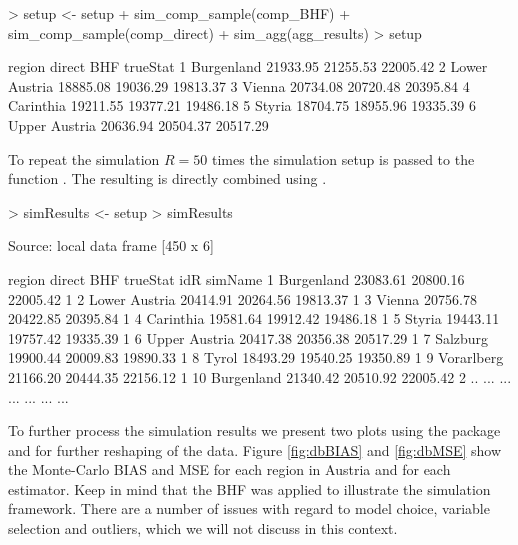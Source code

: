 \documentclass[article]{ajs}
\begin{document}
\begin{Schunk}
\begin{Sinput}
> setup <- setup %
+   sim_comp_sample(comp_BHF) %
+   sim_comp_sample(comp_direct) %
+   sim_agg(agg_results)
> setup
\end{Sinput}
\begin{Soutput}
         region   direct      BHF trueStat
1    Burgenland 21933.95 21255.53 22005.42
2 Lower Austria 18885.08 19036.29 19813.37
3        Vienna 20734.08 20720.48 20395.84
4     Carinthia 19211.55 19377.21 19486.18
5        Styria 18704.75 18955.96 19335.39
6 Upper Austria 20636.94 20504.37 20517.29
\end{Soutput}
\end{Schunk}

To repeat the simulation $R = 50$ times the simulation setup is passed to the function . The resulting  is directly combined using .

\begin{Schunk}
\begin{Sinput}
> simResults <- setup %
> simResults
\end{Sinput}
\begin{Soutput}
Source: local data frame [450 x 6]

          region   direct      BHF trueStat idR simName
1     Burgenland 23083.61 20800.16 22005.42   1        
2  Lower Austria 20414.91 20264.56 19813.37   1        
3         Vienna 20756.78 20422.85 20395.84   1        
4      Carinthia 19581.64 19912.42 19486.18   1        
5         Styria 19443.11 19757.42 19335.39   1        
6  Upper Austria 20417.38 20356.38 20517.29   1        
7       Salzburg 19900.44 20009.83 19890.33   1        
8          Tyrol 18493.29 19540.25 19350.89   1        
9     Vorarlberg 21166.20 20444.35 22156.12   1        
10    Burgenland 21340.42 20510.92 22005.42   2        
..           ...      ...      ...      ... ...     ...
\end{Soutput}
\end{Schunk}

To further process the simulation results we present two plots using the package  \citep{wickham09} and  \citep{wickham07} for further reshaping of the data. Figure \ref{fig:dbBIAS} and \ref{fig:dbMSE} show the Monte-Carlo BIAS and MSE for each region in Austria and for each estimator. Keep in mind that the BHF was applied to illustrate the simulation framework. There are a number of issues with regard to model choice, variable selection and outliers, which we will not discuss in this context.
\end{document}

